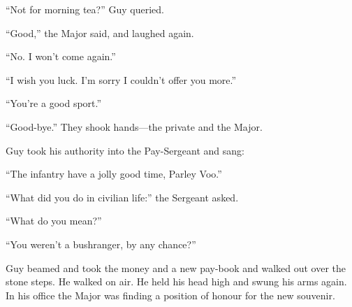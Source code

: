 ``Not for morning tea?'' Guy queried.

``Good,'' the Major said, and laughed again.

``No. I won't come again.''

``I wish you luck. I'm sorry I couldn't offer you more.''

``You're a good sport.''

``Good-bye.'' They shook hands---the private and the Major.

Guy took his authority into the Pay-Sergeant and sang:

``The infantry have a jolly good time, Parley Voo.''

``What did you do in civilian life:'' the Sergeant asked.

``What do you mean?''

``You weren't a bushranger, by any chance?''

Guy beamed and took the money and a new pay-book and walked out over the stone steps. He walked on air. He held his head high and swung his arms again. In his office the Major was finding a position of honour for the new souvenir.
